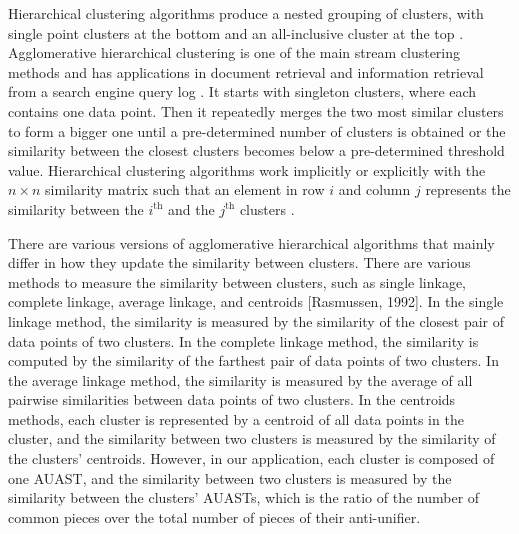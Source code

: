 Hierarchical clustering algorithms produce a nested grouping of clusters, with single point clusters at the bottom and an all-inclusive cluster at the top \cite{karypis1999chameleon}. Agglomerative hierarchical clustering is one of the main stream clustering methods \cite{day1984efficient} and has applications in document retrieval \cite{voorhees1986implementing} and information retrieval from a search engine query log \cite{beeferman2000agglomerative}. It starts with singleton clusters, where each contains one data point. Then it repeatedly merges the two most similar clusters to form a bigger one until a pre-determined number of clusters is obtained or the similarity between the closest clusters becomes below a pre-determined threshold value. Hierarchical clustering algorithms work implicitly or explicitly with the $n \times n$ similarity matrix such that an element in row $i$ and column $j$ represents the similarity between the $i^{\text{th}}$ and the $j^{\text{th}}$ clusters \cite{karypis1999chameleon}.

There are various versions of agglomerative hierarchical algorithms that mainly differ in how they update the similarity between clusters. There are various methods to measure the similarity between clusters, such as single linkage, complete linkage, average linkage, and centroids [Rasmussen, 1992]. In the single linkage method, the similarity is measured by the similarity of the closest pair of data points of two clusters. In the complete linkage method, the similarity is computed by the similarity of the farthest pair of data points of two clusters. In the average linkage method, the similarity is measured by the average of all pairwise similarities between data points of two clusters. In the centroids methods, each cluster is represented by a centroid of all data points in the cluster, and the similarity between two clusters is measured by the similarity of the clusters' centroids.
However, in our application, each cluster is composed of one AUAST, and the similarity between two clusters is measured by the similarity between the clusters' AUASTs, which is the ratio of the number of common pieces over the total number of pieces of their anti-unifier.

